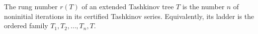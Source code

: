 \begin{definition}
The rung number \(r(T)\) of an extended Tashkinov tree \(T\) is the
number \(n\) of noninitial iterations in its certified Tashkinov series.
Equivalently, its ladder is the ordered family
\(T_1,T_2,\ldots,T_n,T\).
\end{definition}
